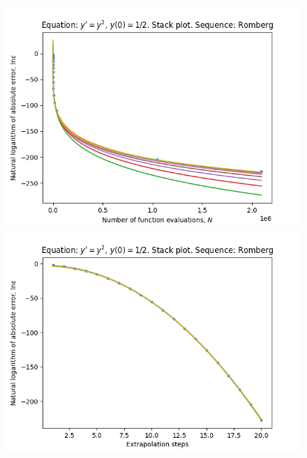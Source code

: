 \begin{figure}[H]
\centering
\begin{minipage}{0.45\textwidth}
\centering
\includegraphics[scale=0.45]{../results/emr_plots/singularity_0_hp_romberg_stack.png}
\end{minipage}
\begin{minipage}{0.45\textwidth}
\centering
\includegraphics[scale=0.45]{../results/emr_plots/singularity_0_hp_romberg_steps_stack.png}
\end{minipage}
\end{figure}

